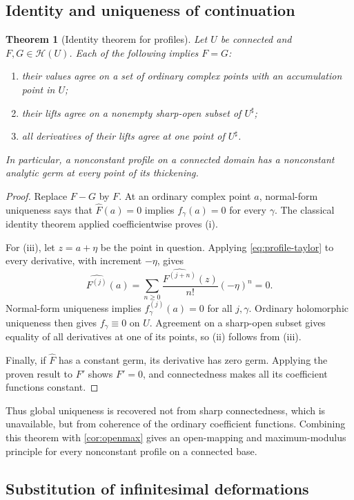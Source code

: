 \documentclass[11pt,a4paper]{article}
\numberwithin{equation}{section}
\newtheorem{theorem}{Theorem}[section]
\theoremstyle{definition}
\newcommand{\HH}{\mathscr H}
\newcommand{\hhat}[1]{\widehat{#1}}
\begin{document}
\subsection{Identity and uniqueness of continuation}

\begin{theorem}[Identity theorem for profiles]\label{thm:profileidentity}
Let $U$ be connected and $F,G\in\HH(U)$. Each of the following implies $F=G$:
\begin{enumerate}[label=(\roman*)]
\item their values agree on a set of ordinary complex points with an
accumulation point in $U$;
\item their lifts agree on a nonempty sharp-open subset of $U^\sharp$;
\item all derivatives of their lifts agree at one point of $U^\sharp$.
\end{enumerate}
In particular, a nonconstant profile on a connected domain has a nonconstant
analytic germ at every point of its thickening.
\end{theorem}
\begin{proof}
Replace $F-G$ by $F$. At an ordinary complex point $a$, normal-form uniqueness
says that $\hhat F(a)=0$ implies $f_\gamma(a)=0$ for every $\gamma$.
The classical identity theorem applied coefficientwise proves (i).

For (iii), let $z=a+\eta$ be the point in question. Applying
\eqref{eq:profile-taylor} to every derivative, with increment $-\eta$, gives
\[
 \hhat{F^{(j)}}(a)=
 \sum_{n\geq0}\frac{\hhat{F^{(j+n)}}(z)}{n!}(-\eta)^n=0.
\]
Normal-form uniqueness implies $f_\gamma^{(j)}(a)=0$ for all $j,\gamma$.
Ordinary holomorphic uniqueness then gives $f_\gamma\equiv0$ on $U$.
Agreement on a sharp-open subset gives equality of all derivatives at one
of its points, so (ii) follows from (iii).

Finally, if $\hhat F$ has a constant germ, its derivative has zero germ.
Applying the proven result to $F'$ shows $F'=0$, and connectedness makes all
its coefficient functions constant.
\end{proof}

Thus global uniqueness is recovered not from sharp connectedness, which is
unavailable, but from coherence of the ordinary coefficient functions.
Combining this theorem with \cref{cor:openmax} gives an open-mapping and
maximum-modulus principle for every nonconstant profile on a connected base.

\subsection{Substitution of infinitesimal deformations}
\end{document}

